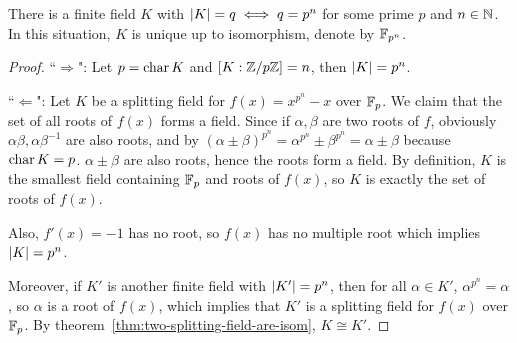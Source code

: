 \begin{theorem} \label{thm:size-of-finite-field}
  There is a finite field $K$ with $\lvert K\rvert = q \iff q = p^n$ for some prime $p$ and $n \in \mathbb{N}$.
  In this situation, $K$ is unique up to isomorphism, denote by $\mathbb{F}_{p^n}$.

  \begin{proof}
    ``$\Rightarrow$": Let $p = \operatorname{char} K$ and $[K : \mathbb{Z}/ p\mathbb{Z}] = n$, then $\lvert K\rvert = p^n$.

    ``$\Leftarrow$": Let $K$ be a splitting field for $f(x) = x^{p^n} - x$ over $\mathbb{F}_p$.
    We claim that the set of all roots of $f(x)$ forms a field. Since if $\alpha, \beta$ are
    two roots of $f$, obviously $\alpha \beta, \alpha \beta^{-1}$ are also roots,
    and by $(\alpha \pm \beta)^{p^n} = \alpha^{p^n} \pm \beta^{p^n} = \alpha \pm \beta$ because
    $\operatorname{char} K = p$.
    $\alpha \pm \beta$ are also roots, hence the roots form a field. By definition, $K$
    is the smallest field containing $\mathbb{F}_p$ and roots of $f(x)$, so
    $K$ is exactly the set of roots of $f(x)$.

    Also, $f'(x) = -1$ has no root, so $f(x)$ has no multiple root which implies $\lvert K\rvert = p^n$.

    Moreover, if $K'$ is another finite field with $\lvert K'\rvert = p^n$, then for all $\alpha \in K'$,
    $\alpha^{p^n} = \alpha$, so $\alpha$ is a root of $f(x)$, which implies that $K'$ is
    a splitting field for $f(x)$ over $\mathbb{F}_p$. By theorem~\ref{thm:two-splitting-field-are-isom},
    $K \cong K'$.
  \end{proof}
\end{theorem}

